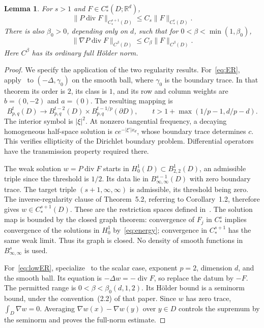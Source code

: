 \documentclass[11pt]{article}
\newtheorem{lemma}[theorem]{Lemma}
\theoremstyle{remark}
\newcommand{\R}{\mathbb R}
\newcommand{\diver}{\operatorname{div}}
\newcommand{\norm}[1]{\lVert #1\rVert}
\newcommand{\abs}[1]{\lvert #1\rvert}
\begin{document}
\begin{lemma}\label{lem:elliptic}
For $s>1$ and $F\in C_*^s(D;\R^d)$,
\begin{equation}\label{eq:ER}
 \norm{P\diver F}_{C_*^{s+1}(D)}\le C_s\norm{F}_{C_*^s(D)}.
\end{equation}
There is also $\beta_0>0$, depending only on $d$, such that for $0<\beta<\min(1,\beta_0)$,
\begin{equation}\label{eq:lowER}
 \norm{\nabla P\diver F}_{C^\beta(D)}
 \le C_\beta\norm{F}_{C^\beta(D)}.
\end{equation}
Here $C^\beta$ has its ordinary full H\"older norm.
\end{lemma}
\begin{proof}
We specify the application of the two regularity results. For~\eqref{eq:ER}, apply~\cite[Theorem~5.2]{Johnsen} to $(-\Delta,\gamma_0)$ on the smooth ball, where $\gamma_0$ is the boundary trace. In that theorem its order is $2$, its class is $1$, and its row and column weights are $b=(0,-2)$ and $a=(0)$. The resulting mapping is
\[
 B^t_{p,q}(D)\longrightarrow
 B^{t-2}_{p,q}(D)\times B^{t-1/p}_{p,q}(\partial D),
 \qquad t>1+\max(1/p-1,d/p-d).
\]
The interior symbol is $\abs{\xi}^2$. At nonzero tangential frequency, a decaying homogeneous half-space solution is $c e^{-\abs{\xi'}x_d}$, whose boundary trace determines $c$. This verifies ellipticity of the Dirichlet boundary problem. Differential operators have the transmission property required there.

The weak solution $w=P\diver F$ starts in $H_0^1(D)\subset B^1_{2,2}(D)$, an admissible triple since the threshold is $1/2$. Its data lie in $B^{s-1}_{\infty,\infty}(D)$ with zero boundary trace. The target triple $(s+1,\infty,\infty)$ is admissible, its threshold being zero. The inverse-regularity clause of Theorem~5.2, referring to Corollary~1.2, therefore gives $w\in C_*^{s+1}(D)$. These are the restriction spaces defined in~\cite[(2.21)--(2.22)]{Johnsen}. The solution map is bounded by the closed graph theorem: convergence of $F_j$ in $C_*^s$ implies convergence of the solutions in $H_0^1$ by~\eqref{eq:energy}; convergence in $C_*^{s+1}$ has the same weak limit. Thus its graph is closed. No density of smooth functions in $B^s_{\infty,\infty}$ is used.

For~\eqref{eq:lowER}, specialize~\cite[Corollary~2.7]{BCDS} to the scalar case, exponent $p=2$, dimension $d$, and the smooth ball. Its equation is $-\Delta w=-\diver F$, so replace the datum by $-F$. The permitted range is $0<\beta<\beta_0(d,1,2)$. Its H\"older bound is a seminorm bound, under the convention~(2.2) of that paper. Since $w$ has zero trace, $\int_D\nabla w=0$. Averaging $\nabla w(x)-\nabla w(y)$ over $y\in D$ controls the supremum by the seminorm and proves the full-norm estimate.
\end{proof}
\end{document}
